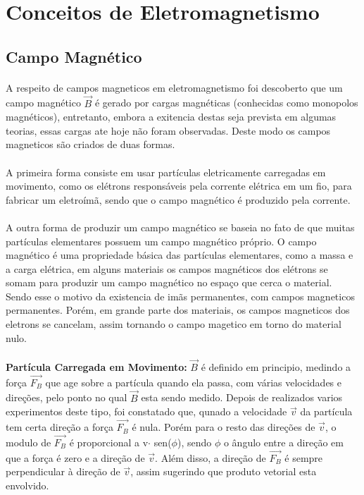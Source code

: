 \documentclass[a4paper, 12pt]{article}
\begin{document}
\section{Conceitos de Eletromagnetismo}
    \subsection{Campo Magnético}
\paragraph{}A respeito de campos magneticos em eletromagnetismo foi descoberto que um campo magnético $\overrightarrow{B}$ é gerado por cargas magnéticas (conhecidas como monopolos magnéticos), entretanto, embora a exitencia destas seja prevista em algumas teorias, essas cargas ate hoje não foram observadas. Deste modo os campos magneticos são criados de duas formas.

\paragraph{}A primeira forma consiste em usar partículas eletricamente carregadas em movimento, como os elétrons responsáveis pela corrente elétrica em um fio, para fabricar um eletroímã, sendo que o campo magnético é produzido pela corrente.

\paragraph{}A outra forma de produzir um campo magnético se baseia no fato de que muitas partículas elementares possuem um campo magnético próprio. O campo magnético é uma propriedade básica das partículas elementares, como a massa e a carga elétrica, em alguns materiais os campos magnéticos dos elétrons se somam para produzir um campo magnético no espaço que cerca o material. Sendo esse o motivo da existencia de imãs permanentes, com campos magneticos permanentes. Porém, em grande parte dos materiais, os campos magneticos dos eletrons se cancelam, assim tornando o campo magetico em torno do material nulo. 

\paragraph{}\textbf{Partícula Carregada em Movimento:} $\overrightarrow{B}$ é definido em principio, medindo a força $\overrightarrow{F_B}$ que age sobre a partícula quando ela passa, com várias velocidades e direções, pelo ponto no qual $\overrightarrow{B}$ esta sendo medido. Depois de realizados varios experimentos deste tipo, foi constatado que, qunado a velocidade $\overrightarrow{v}$ da partícula tem certa direção a força $\overrightarrow{F_B}$ é nula. Porém para o resto das direções de $\overrightarrow{v}$, o modulo de $\overrightarrow{F_B}$ é proporcional a v$\cdot$ sen($\phi$), sendo $\phi$ o ângulo entre a direção em que a força é zero e a direção de $\overrightarrow{v}$. Além disso, a direção de $\overrightarrow{F_B}$ é sempre perpendicular à direção de $\overrightarrow{v}$, assim sugerindo que produto vetorial esta envolvido.
\end{document}
